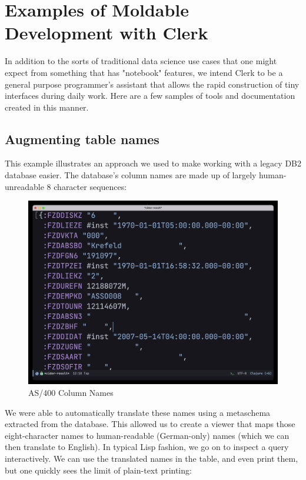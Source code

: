 \documentclass[sigconf,screen]{acmart}
\begin{document}
\hypertarget{id}{%
\section{Examples of Moldable Development with Clerk}\label{id}}

In addition to the sorts of traditional data science use cases that one might expect from something that has "notebook" features, we intend Clerk to be a general purpose programmer's assistant that allows the rapid construction of tiny interfaces during daily work. Here are a few samples of tools and documentation created in this manner.

\hypertarget{id}{%
\subsection{Augmenting table names}\label{id}}

This example illustrates an approach we used to make working with a legacy DB2 database easier. The database's column names are made up of largely human-unreadable 8 character sequences:

\begin{figure}[H]
\centering
\includegraphics{images/as400-column-names.png}
\caption{AS/400 Column Names}
\end{figure}

We were able to automatically translate these names using a metaschema extracted from the database. This allowed us to create a viewer that maps those eight-character names to human-readable (German-only) names (which we can then translate to English). In typical Lisp fashion, we go on to inspect a query interactively. We can use the translated names in the table, and even print them, but one quickly sees the limit of plain-text printing:
\end{document}
